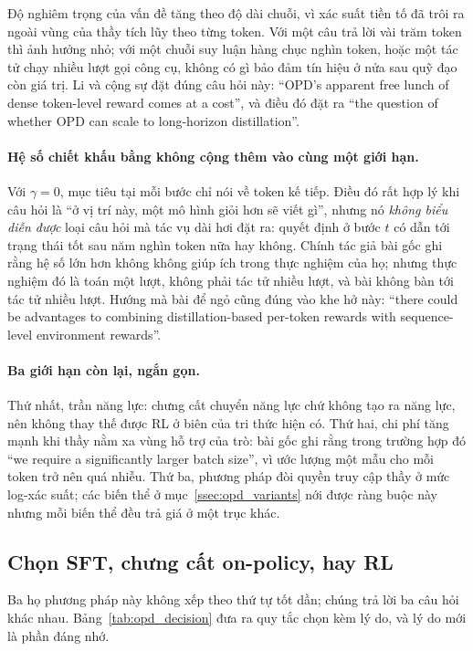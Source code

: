 Độ nghiêm trọng của vấn đề tăng theo độ dài chuỗi, vì xác suất tiền tố đã trôi ra ngoài vùng của thầy tích lũy theo từng token. Với một câu trả lời vài trăm token thì ảnh hưởng nhỏ; với một chuỗi suy luận hàng chục nghìn token, hoặc một tác tử chạy nhiều lượt gọi công cụ, không có gì bảo đảm tín hiệu ở nửa sau quỹ đạo còn giá trị. Li và cộng sự \cite{li2026rethinkingopd} đặt đúng câu hỏi này: ``OPD's apparent free lunch of dense token-level reward comes at a cost'', và điều đó đặt ra ``the question of whether OPD can scale to long-horizon distillation''.

\paragraph{Hệ số chiết khấu bằng không cộng thêm vào cùng một giới hạn.} Với $\gamma = 0$, mục tiêu tại mỗi bước chỉ nói về token kế tiếp. Điều đó rất hợp lý khi câu hỏi là ``ở vị trí này, một mô hình giỏi hơn sẽ viết gì'', nhưng nó \emph{không biểu diễn được} loại câu hỏi mà tác vụ dài hơi đặt ra: quyết định ở bước $t$ có dẫn tới trạng thái tốt sau năm nghìn token nữa hay không. Chính tác giả bài gốc ghi rằng hệ số lớn hơn không không giúp ích trong thực nghiệm của họ; nhưng thực nghiệm đó là toán một lượt, không phải tác tử nhiều lượt, và bài không bàn tới tác tử nhiều lượt. Hướng mà bài để ngỏ cũng đúng vào khe hở này: ``there could be advantages to combining distillation-based per-token rewards with sequence-level environment rewards''.

\paragraph{Ba giới hạn còn lại, ngắn gọn.} Thứ nhất, trần năng lực: chưng cất chuyển năng lực chứ không tạo ra năng lực, nên không thay thế được RL ở biên của tri thức hiện có. Thứ hai, chi phí tăng mạnh khi thầy nằm xa vùng hỗ trợ của trò: bài gốc ghi rằng trong trường hợp đó ``we require a significantly larger batch size'', vì ước lượng một mẫu cho mỗi token trở nên quá nhiễu. Thứ ba, phương pháp đòi quyền truy cập thầy ở mức log-xác suất; các biến thể ở mục~\ref{ssec:opd_variants} nới được ràng buộc này nhưng mỗi biến thể đều trả giá ở một trục khác.

\subsection{Chọn SFT, chưng cất on-policy, hay RL}
\label{ssec:opd_decision}

Ba họ phương pháp này không xếp theo thứ tự tốt dần; chúng trả lời ba câu hỏi khác nhau. Bảng~\ref{tab:opd_decision} đưa ra quy tắc chọn kèm lý do, và lý do mới là phần đáng nhớ.


